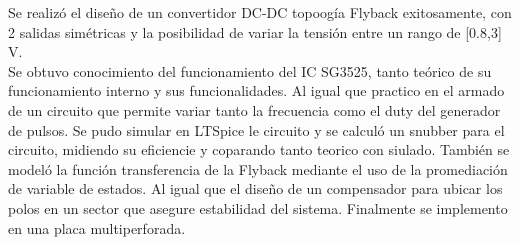 Se realizó el diseño de un convertidor DC-DC topoogía Flyback exitosamente, con 2 salidas simétricas y la posibilidad de variar la tensión entre un rango de [0.8,3] V.\\
Se obtuvo conocimiento del funcionamiento del IC SG3525, tanto teórico de su funcionamiento interno y sus funcionalidades. Al igual que practico en el armado de un circuito que permite variar tanto la frecuencia como el duty del generador de pulsos. 
 Se pudo simular en LTSpice le circuito y se calculó un snubber para el circuito, midiendo su eficiencie y coparando tanto teorico con siulado. También se modeló la función transferencia de la Flyback mediante el uso de la promediación de variable de estados. Al igual que el diseño de un compensador para ubicar los polos en un sector que asegure estabilidad del sistema. Finalmente se implemento en una placa multiperforada. 